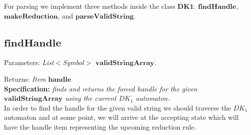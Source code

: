 For parsing we implement three methods inside the class \(\boldsymbol{DK1}\):  \(\boldsymbol{findHandle}\), \(\boldsymbol{makeReduction}\), and \(\boldsymbol{parseValidString}\).

\vspace{10pt}

\subsection{\(\boldsymbol{findHandle}\)}

Parameters: \textit{List\(<\)Symbol\(>\) \(\boldsymbol{validStringArray}\).}

Returns: \textit{Item \(\boldsymbol{handle}\)}\\

\textbf{Specification:} \textit{finds and returns the forced handle for the given \(\boldsymbol{validStringArray}\) using the current \(DK_{1}\) automaton.}\\

In order to find the handle for the given valid string we should traverse the \(DK_{1}\) automaton and at some point, we will arrive at the accepting state which will have the handle item representing the upcoming reduction rule.

\vspace{10pt}

